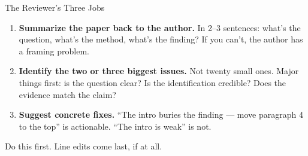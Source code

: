 \begin{frame}{The Reviewer's Three Jobs}
  \begin{enumerate}
    \item \textbf{Summarize the paper back to the author.} In 2--3 sentences: what's the question, what's the method, what's the finding? If you can't, the author has a framing problem.

    \vspace{4pt}

    \item \textbf{Identify the two or three biggest issues.} Not twenty small ones. Major things first: is the question clear? Is the identification credible? Does the evidence match the claim?

    \vspace{4pt}

    \item \textbf{Suggest concrete fixes.} ``The intro buries the finding --- move paragraph 4 to the top'' is actionable. ``The intro is weak'' is not.
  \end{enumerate}

  \vspace{6pt}

  Do this first. Line edits come last, if at all.
\end{frame}

